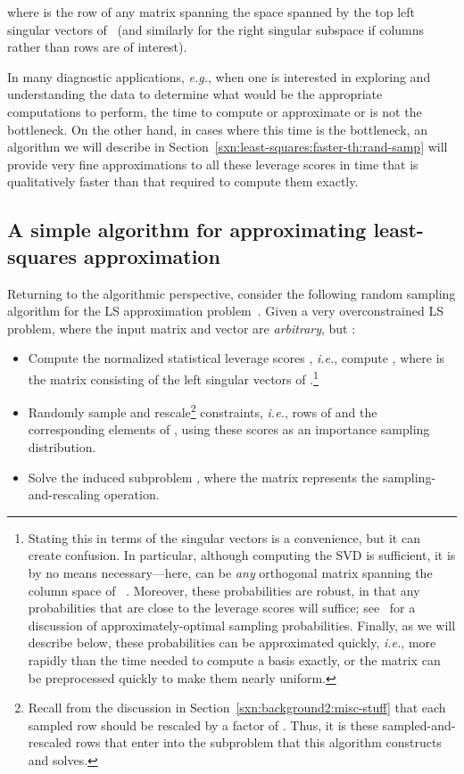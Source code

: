 \documentclass[twoside]{article}
\begin{document}
where  is the  row of any
matrix spanning the space spanned by the top  left singular vectors 
of~ (and similarly for the right singular subspace if columns rather than 
rows are of interest).

In many diagnostic applications, \emph{e.g.}, when one is interested in 
exploring and understanding the data to determine what would be the 
appropriate computations to perform, the time to compute or approximate 
 or  is not the bottleneck.
On the other hand, in cases where this time is the bottleneck, an algorithm 
we will describe in Section~\ref{sxn:least-squares:faster-th:rand-samp}
will provide very fine approximations to all these 
leverage scores in time that is qualitatively faster than that required to 
compute them exactly.


\subsection{A simple algorithm for approximating least-squares approximation}
\label{sxn:least-squares:algorithm}

Returning to the algorithmic perspective, consider the following random 
sampling algorithm for the LS approximation 
problem~\cite{DMM06,DMM08_CURtheory_JRNL}.
Given a very overconstrained LS problem, where the input matrix
 and vector  are \emph{arbitrary}, but :
\begin{itemize}
\item
Compute the normalized statistical leverage scores , 
\emph{i.e.}, compute , where  is the 
 matrix consisting of the left singular vectors of .\footnote{Stating this in terms of the singular vectors is a convenience, 
but it can create confusion.  In particular, although computing the SVD 
is sufficient, it is by no means necessary---here,  can be \emph{any} 
orthogonal matrix spanning the column space of ~\cite{CUR_PNAS}.  
Moreover, these probabilities are robust, in that any probabilities that 
are close to the leverage scores will suffice; see~\cite{dkm_matrix1} for 
a discussion of approximately-optimal sampling probabilities.
Finally, as we will describe below, these probabilities can be approximated
quickly, \emph{i.e.}, more rapidly than the time needed to compute a basis
exactly, or the matrix can be preprocessed quickly to make them nearly 
uniform.}
\item
Randomly sample and rescale\footnote{Recall from the discussion in 
Section~\ref{sxn:background2:misc-stuff} that each sampled row should be 
rescaled by a factor of .  Thus, it is these sampled-and-rescaled 
rows that enter into the subproblem that this algorithm constructs and solves.}
 constraints, 
\emph{i.e.}, rows of  and the corresponding elements of , using these
scores as an importance sampling distribution.
\item
Solve the induced subproblem
, where the 
 matrix  represents the sampling-and-rescaling operation.
\end{itemize}
\end{document}
